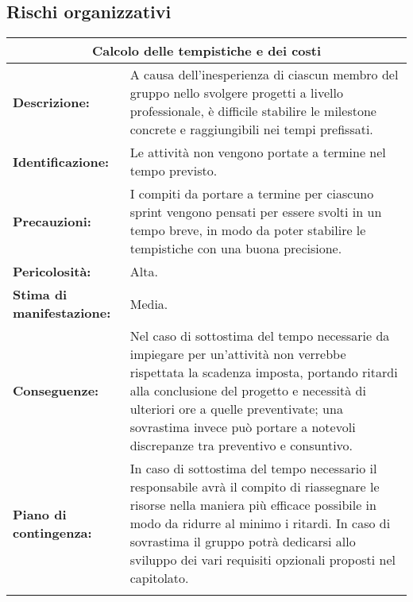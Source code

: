 \subsection{Rischi organizzativi}

\renewcommand\tabularxcolumn[1]{>{\Centering}m{#1}}
\begin{tabularx}{\textwidth}{|X|X|}
\hline
\multicolumn{2}{|c|}{\textbf{Calcolo delle tempistiche e dei costi}} \\
\hline
\textbf{Descrizione:}& A causa dell'inesperienza di ciascun membro del gruppo nello svolgere progetti a livello professionale, è difficile stabilire le milestone concrete e raggiungibili nei tempi prefissati. \\
\hline
\textbf{Identificazione:}& Le attività non vengono portate a termine nel tempo previsto. \\
\hline
\textbf{Precauzioni:}& I compiti da portare a termine per ciascuno sprint vengono pensati per essere svolti in un tempo breve, in modo da poter stabilire le tempistiche con una buona precisione. \\
\hline
\textbf{Pericolosità:}& Alta.\\
\hline
\textbf{Stima di manifestazione:}& Media.\\
\hline
\textbf{Conseguenze:}& Nel caso di sottostima del tempo necessarie da impiegare per un'attività non verrebbe rispettata la scadenza imposta, portando ritardi alla conclusione del progetto e necessità di ulteriori ore a quelle preventivate; una sovrastima invece può portare a notevoli discrepanze tra preventivo e consuntivo. \\
\hline
\textbf{Piano di contingenza:}& In caso di sottostima del tempo necessario il responsabile avrà il compito di riassegnare le risorse nella maniera più efficace possibile in modo da ridurre al minimo i ritardi. In caso di sovrastima il gruppo potrà dedicarsi allo sviluppo dei vari requisiti opzionali proposti nel capitolato.\\
\hline
\caption{Calcolo delle tempistiche e dei costi}
\end{tabularx}

\vspace{20pt}

